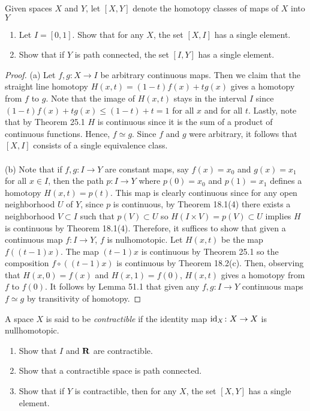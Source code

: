\newpage
\begin{problem}[Munkres \S51, Ex.\,2]
Given spaces $X$ and $Y$, let $[X,Y]$ denote the homotopy classes
of maps of $X$ into $Y$
\begin{enumerate}[label=(\alph*)]
\item Let $I=[0,1]$. Show that for any $X$, the set $[X,I]$ has a
  single element.
\item Show that if $Y$ is path connected, the set $[I,Y]$ has a
  single element.
\end{enumerate}
\end{problem}
\begin{proof}
(a) Let $f,g\colon X\to I$ be arbitrary continuous maps. Then we
claim that the straight line homotopy $H(x,t)=(1-t)f(x)+tg(x)$
gives a homotopy from $f$ to $g$. Note that the image of $H(x,t)$
stays in the interval $I$ since $(1-t)f(x)+tg(x)\leq (1-t)+t=1$
for all $x$ and for all $t$. Lastly, note that by Theorem 25.1
$H$ is continuous since it is the sum of a product of continuous
functions. Hence, $f\simeq g$. Since $f$ and $g$ were arbitrary,
it follows that $[X,I]$ consists of a single equivalence class.
\\\\
(b) Note that if $f,g\colon I\to Y$ are constant maps, say $f(x)=x_0$ and
$g(x)=x_1$ for all $x\in I$, then the path $p\colon I\to Y$ where
$p(0)=x_0$ and $p(1)=x_1$ defines a homotopy $H(x,t)=p(t)$. This map is
clearly continuous since for any open neighborhood $U$ of $Y$, since $p$ is
continuous, by Theorem 18.1(4) there exists a neighborhood $V\subset I$
such that $p(V)\subset U$ so $H(I\times V)=p(V)\subset U$ implies $H$ is
continuous by Theorem 18.1(4). Therefore, it suffices to show that given a
continuous map $f\colon I\to Y$, $f$ is nulhomotopic. Let $H(x,t)$ be the
map $f((t-1)x)$. The map $(t-1)x$ is continuous by Theorem 25.1 so the
composition $f\circ((t-1)x)$ is continuous by Theorem 18.2(c). Then,
observing that $H(x,0)=f(x)$ and $H(x,1)=f(0)$, $H(x,t)$ gives a homotopy
from $f$ to $f(0)$. It follows by Lemma 51.1 that given any $f,g\colon I\to
Y$ continuous maps $f\simeq g$ by transitivity of homotopy.
\end{proof}
\newpage
\begin{problem}[Munkres \S51, Ex.\,3(a,b,c,)]
A space $X$ is said to be \emph{contractible} if the identity map
$\operatorname{id}_X\colon X\to X$ is nullhomotopic.
\begin{enumerate}[label=(\alph*)]
\item Show that $I$ and $\mathbf{R}$ are contractible.
\item Show that a contractible space is path connected.
\item Show that if $Y$ is contractible, then for any $X$, the set
  $[X,Y]$ has a single element.
\end{enumerate}
\end{problem}
